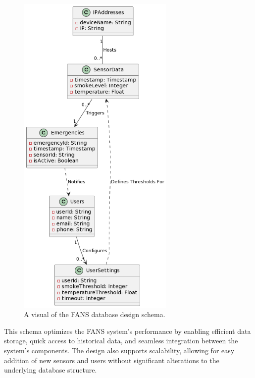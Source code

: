 \begin{figure}[H]
    \centering
    \includegraphics[width=3in]{../assets/DatabaseTableDesign.png}
    \caption{A visual of the FANS database design schema.}
\end{figure}

This schema optimizes the FANS system's performance by enabling efficient data storage, quick access to historical
data, and seamless integration between the system's components. The design also supports scalability, allowing for easy
addition of new sensors and users without significant alterations to the underlying database structure.
